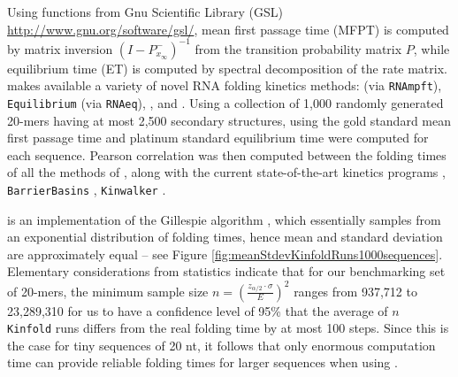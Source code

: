 Using functions from Gnu Scientific Library (GSL)
\url{http://www.gnu.org/software/gsl/}, mean first passage time
(MFPT) is computed by matrix inversion
$(I - P^{-}_{x_{\infty}})^{-1}$ from the transition probability matrix
$P$, while equilibrium time (ET) is computed by spectral
decomposition of the rate matrix. \hermes makes available a
variety of novel RNA folding kinetics methods: \rnamfpt (via {\tt RNAmpft}), {\tt
Equilibrium} (via {\tt RNAeq}), \fftmfpt, and \ffteq.
Using a collection of 1,000 randomly generated 20-mers having at most
2,500 secondary structures, using \hermes the gold standard
mean first passage time and platinum standard equilibrium time were
computed for each sequence.
Pearson correlation was then computed
between the folding times of all the methods of \hermes, along
with the current state-of-the-art kinetics programs \kinfold
\cite{flamm}, {\tt BarrierBasins} \cite{wolfingerStadler:kinetics},
{\tt Kinwalker} \cite{Geis.jmb08}.

\kinfold is an implementation
of the Gillespie algorithm \cite{gillespieStochasticSimulation1},
which essentially samples from an exponential distribution of folding
times, hence \kinfold mean and standard deviation are
approximately equal -- see
Figure \ref{fig:meanStdevKinfoldRuns1000sequences}. Elementary
considerations from statistics indicate that for our benchmarking set
of 20-mers, the minimum sample size $n = \left( \frac{z_{\alpha/2}
\cdot \sigma}{E} \right)^2$ ranges from 937,712 to 23,289,310 for us
to have a confidence level of 95\% that the average of $n$ {\tt
Kinfold} runs differs from the real folding time by at most 100 steps.
Since this is the case for tiny sequences of 20 nt, it follows that
only enormous computation time can provide reliable folding times for
larger sequences when using \kinfold.

